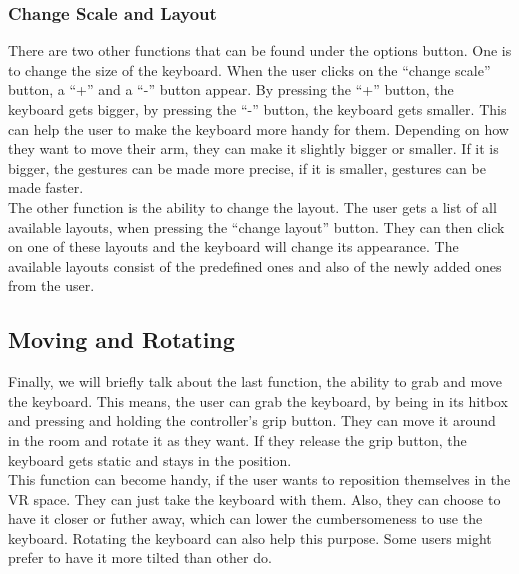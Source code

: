 \subsubsection{Change Scale and Layout}
There are two other functions that can be found under the options button. One is to change the size of the keyboard. When the user clicks on the ``change scale'' button, a ``+'' and a ``-'' button appear. By pressing the ``+'' button, the keyboard gets bigger, by pressing the ``-'' button, the keyboard gets smaller. This can help the user to make the keyboard more handy for them. Depending on how they want to move their arm, they can make it slightly bigger or smaller. If it is bigger, the gestures can be made more precise, if it is smaller, gestures can be made faster.\\
The other function is the ability to change the layout. The user gets a list of all available layouts, when pressing the ``change layout'' button. They can then click on one of these layouts and the keyboard will change its appearance. The available layouts consist of the predefined ones and also of the newly added ones from the user.

\subsection{Moving and Rotating}
Finally, we will briefly talk about the last function, the ability to grab and move the keyboard. This means, the user can grab the keyboard, by being in its hitbox and pressing and holding the controller's grip button. They can move it around in the room and rotate it as they want. If they release the grip button, the keyboard gets static and stays in the position.\\
This function can become handy, if the user wants to reposition themselves in the VR space. They can just take the keyboard with them. Also, they can choose to have it closer or futher away, which can lower the cumbersomeness to use the keyboard. Rotating the keyboard can also help this purpose. Some users might prefer to have it more tilted than other do.